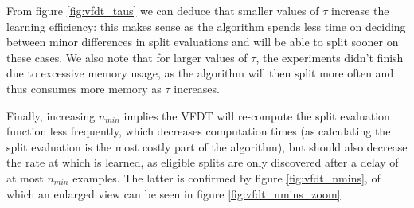 \documentclass[12pt]{article}
\begin{document}
From figure \ref{fig:vfdt_taus} we can deduce that smaller values of $\tau$ increase the learning efficiency: this makes sense as the algorithm spends less time on deciding between minor differences in split evaluations and will be able to split sooner on these cases. We also note that for larger values of $\tau$, the experiments didn't finish due to excessive memory usage, as the algorithm will then split more often and thus consumes more memory as $\tau$ increases.

 Finally, increasing $n_{min}$ implies the VFDT will re-compute the split evaluation function less frequently, which decreases computation times (as calculating the split evaluation is the most costly part of the algorithm), but should also decrease the rate at which is learned, as eligible splits are only discovered after a delay of at most $n_{min}$ examples. The latter is confirmed by figure \ref{fig:vfdt_nmins}, of which an enlarged view can be seen in figure \ref{fig:vfdt_nmins_zoom}.
\end{document}

